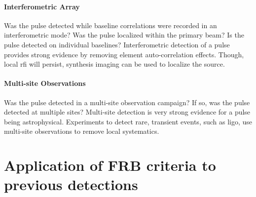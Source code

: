 \documentclass[a4paper,fleqn,usenatbib]{mnras}
\begin{document}
\paragraph{Interferometric Array}

Was the pulse detected while baseline correlations were recorded in an
interferometric mode? Was the pulse localized within the primary beam? Is the
pulse detected on individual baselines? Interferometric detection of a pulse
provides strong evidence by removing element auto-correlation effects. Though,
local \gls{rfi} will persist, synthesis imaging can be used to localize the
source.

\paragraph{Multi-site Observations}

Was the pulse detected in a multi-site observation campaign? If so, was the
pulse detected at multiple sites? Multi-site detection is very strong evidence
for a pulse being astrophysical. Experiments to detect rare, transient events,
such as \gls{ligo}, use multi-site observations to remove local systematics.

\section{Application of FRB criteria to previous detections}
\label{sec:appln_to_previous_detections}
\end{document}

